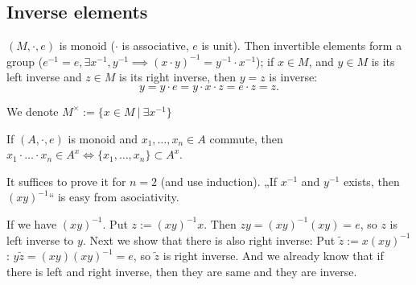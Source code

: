 \documentclass[12pt]{article}					%
\begin{document}
\subsection{Inverse elements}
\begin{definice}
	$(M, ·, e)$ is monoid ($·$ is associative, $e$ is unit). Then invertible elements form a group ($e^{-1} = e, \exists x^{-1}, y^{-1} \implies (x·y)^{-1} = y^{-1}·x^{-1}$); if $x \in M$, and $y \in M$ is its left inverse and $z \in M$ is its right inverse, then $y = z$ is inverse:
	$$ y = y·e = y·x·z = e·z = z. $$

	We denote $M^\times := \{x \in M\ |\ \exists x^{-1}\}$
\end{definice}


\begin{tvrzeni}
	If $(A, ·, e)$ is monoid and $x_1, …, x_n \in A$ commute, then $x_1·…·x_n \in A^x \Leftrightarrow \{x_1, …, x_n\} \subset A^x$.

	\begin{dukazin}
		It suffices to prove it for $n=2$ (and use induction). „If $x^{-1}$ and $y^{-1}$ exists, then $(xy)^{-1}$“ is easy from asociativity.

		If we have $(xy)^{-1}$. Put $z:= (xy)^{-1}x$. Then $zy = (xy)^{-1}(xy) = e$, so $z$ is left inverse to $y$. Next we show that there is also right inverse: Put $\tilde z := x(xy)^{-1}$: $y\tilde z = (xy)(xy)^{-1} = e$, so $\tilde z$ is right inverse. And we already know that if there is left and right inverse, then they are same and they are inverse.
	\end{dukazin}
\end{tvrzeni}
\end{document}
